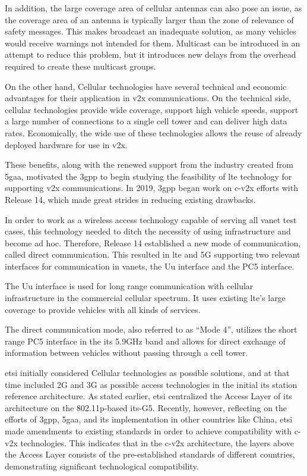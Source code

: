 In addition, the large coverage area of cellular antennas can also pose an issue, as the coverage area of an antenna is typically larger than the zone of relevance of safety messages. This makes broadcast an inadequate solution, as many vehicles would receive warnings not intended for them. Multicast can be introduced in an attempt to reduce this problem, but it introduces new delays from the overhead required to create these multicast groups\cite{gyawali_challenges_2021}.

On the other hand, Cellular technologies have several technical and economic advantages for their application in \gls{v2x} communications. On the technical side, cellular technologies provide wide coverage, support high vehicle speeds, support a large number of connections to a single cell tower and can deliver high data rates. Economically, the wide use of these technologies allows the reuse of already deployed hardware for use in \gls{v2x}\cite{gyawali_challenges_2021}.

These benefits, along with the renewed support from the industry created from \gls{5gaa}, motivated the \gls{3gpp} to begin studying the feasibility of \gls{lte} technology for supporting \gls{v2x} communications\cite{gyawali_challenges_2021}. In 2019, \gls{3gpp} began work on \gls{c-v2x} efforts with Release 14, which made great strides in reducing existing drawbacks.

In order to work as a wireless access technology capable of serving all \gls{vanet} test cases, this technology needed to ditch the necessity of using infrastructure and become ad hoc. Therefore, Release 14 established a new mode of communication, called direct communication.\cite{weber_c-v2x_2019} This resulted in \gls{lte} and 5G supporting two relevant interfaces for communication in \glspl{vanet}, the Uu interface and the PC5 interface.

The Uu interface is used for long range communication with cellular infrastructure in the commercial cellular spectrum. It uses existing \gls{lte}'s large coverage to provide vehicles with all kinds of services\cite{weber_c-v2x_2019}.

The direct communication mode, also referred to as “Mode 4”, utilizes the short range PC5 interface in the \gls{its} 5.9GHz band and allows for direct exchange of information between vehicles without passing through a cell tower.


\gls{etsi} initially considered Cellular technologies as possible solutions, and at that time included 2G and 3G as possible access technologies in the initial \gls{its} station reference architecture. As stated earlier, \gls{etsi} centralized the Access Layer of its architecture on the 802.11p-based \gls{its}-G5. Recently, however, reflecting on the efforts of \gls{3gpp}, \gls{5gaa}, and \gls{its} implementation in other countries like China, \gls{etsi} made amendments to existing standards in order to achieve compatibility with \gls{c-v2x} technologies\cite{weber_c-v2x_2019}. This indicates that in the \gls{c-v2x} architecture, the layers above the Access Layer consists of the pre-established standards of different countries, demonstrating significant technological compatibility.



